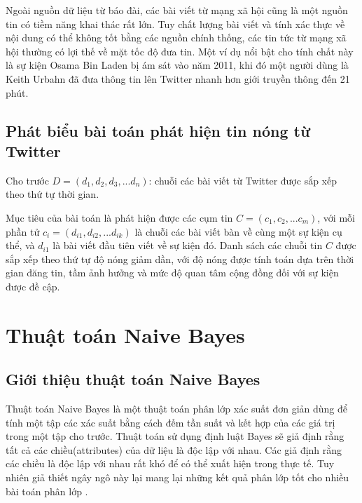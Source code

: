 	Ngoài nguồn dữ liệu từ báo đài, các bài viết từ mạng xã hội cũng là một nguồn tin có tiềm năng khai thác rất lớn. Tuy chất lượng bài viết và tính xác thực về nội dung có thể không tốt bằng các nguồn chính thống, các tin tức từ mạng xã hội thường có lợi thế về mặt tốc độ đưa tin. Một ví dụ nổi bật cho tính chất này là sự kiện Osama Bin Laden bị ám sát vào năm 2011, khi đó một người dùng là Keith Urbahn đã đưa thông tin lên Twitter nhanh hơn giới truyền thông đến 21 phút.

	\subsection{Phát biểu bài toán phát hiện tin nóng từ Twitter}
	Cho trước $D = (d_1, d_2, d_3,... d_n)$: chuỗi các bài viết từ Twitter được sắp xếp theo thứ tự thời gian.
	
	Mục tiêu của bài toán là phát hiện được các cụm tin $C = (c_1, c_2,... c_m)$, với mỗi phần tử $c_i = (d_{i1}, d_{i2},... d_{ik})$ là chuỗi các bài viết bàn về cùng một sự kiện cụ thể, và $d_{i1}$ là bài viết đầu tiên viết về sự kiện đó. Danh sách các chuỗi tin $C$  được sắp xếp theo thứ tự độ nóng giảm dần, với độ nóng được tính toán dựa trên thời gian đăng tin, tầm ảnh hưởng và mức độ quan tâm cộng đồng đối với sự kiện được đề cập.
	
	
\section{Thuật toán Naive Bayes}
\subsection{Giới thiệu thuật toán Naive Bayes}
	 Thuật toán Naive Bayes là một thuật toán phân lớp xác suất đơn giản dùng để tính một tập các xác suất bằng cách đếm tần suất và kết hợp của các giá trị trong một tập cho trước. Thuật toán sử dụng định luật Bayes sẽ giả định rằng tất cả các chiều(attributes) của dữ liệu là độc lập với nhau. Các giả định rằng các chiều là độc lập với nhau rất khó để có thể xuất hiện trong thực tế. Tuy nhiên giả thiết ngây ngô này lại mang lại những kết quả phân lớp tốt cho nhiều bài toán phân lớp \cite{dimitoglou2012comparison}.
